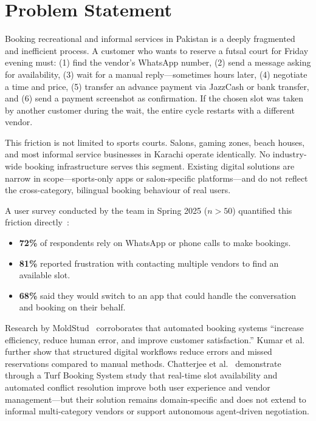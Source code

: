 \section{Problem Statement}
\label{sec:intro-problem}

Booking recreational and informal services in Pakistan is a deeply fragmented and
inefficient process.  A customer who wants to reserve a futsal court for Friday
evening must: (1) find the vendor's WhatsApp number, (2) send a message asking for
availability, (3) wait for a manual reply---sometimes hours later, (4) negotiate a
time and price, (5) transfer an advance payment via JazzCash or bank transfer, and
(6) send a payment screenshot as confirmation.  If the chosen slot was taken by
another customer during the wait, the entire cycle restarts with a different vendor.

This friction is not limited to sports courts.  Salons, gaming zones, beach houses,
and most informal service businesses in Karachi operate identically.  No industry-wide
booking infrastructure serves this segment.  Existing digital solutions are narrow in
scope---sports-only apps or salon-specific platforms---and do not reflect the
cross-category, bilingual booking behaviour of real users.

A user survey conducted by the team in Spring 2025 ($n > 50$) quantified this
friction directly~\cite{survey2025}:
\begin{itemize}
  \item \textbf{72\%} of respondents rely on WhatsApp or phone calls to make bookings.
  \item \textbf{81\%} reported frustration with contacting multiple vendors to find
        an available slot.
  \item \textbf{68\%} said they would switch to an app that could handle the
        conversation and booking on their behalf.
\end{itemize}

Research by MoldStud~\cite{moldstud2024} corroborates that automated booking systems
``increase efficiency, reduce human error, and improve customer satisfaction.''
Kumar et al.~\cite{kumar2020} further show that structured digital workflows reduce
errors and missed reservations compared to manual methods.  Chatterjee et
al.~\cite{chatterjee2025} demonstrate through a Turf Booking System study that
real-time slot availability and automated conflict resolution improve both user
experience and vendor management---but their solution remains domain-specific and
does not extend to informal multi-category vendors or support autonomous agent-driven
negotiation.

